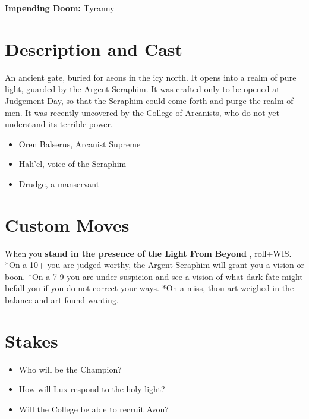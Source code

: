  \textbf{Impending Doom:}
 Tyranny
\section*{Description and Cast}


 An ancient gate, buried for aeons in the icy north. It opens into a realm of pure light, guarded by the Argent Seraphim. It was crafted only to be opened at Judgement Day, so that the Seraphim could come forth and purge the realm of men. It was recently uncovered by the College of Arcanists, who do not yet understand its terrible power.
\begin{itemize}
\item Oren Balserus, Arcanist Supreme
\item Hali'el, voice of the Seraphim
\item Drudge, a manservant

\end{itemize}
\section*{Custom Moves}


 When you \textbf{stand in the presence of the Light From Beyond}
, roll+WIS. *On a 10+ you are judged worthy, the Argent Seraphim will grant you a vision or boon. *On a 7-9 you are under suspicion and see a vision of what dark fate might befall you if you do not correct your ways. *On a miss, thou art weighed in the balance and art found wanting.
\section*{Stakes}
\begin{itemize}
\item Who will be the Champion?
\item How will Lux respond to the holy light?
\item Will the College be able to recruit Avon?

\end{itemize}


